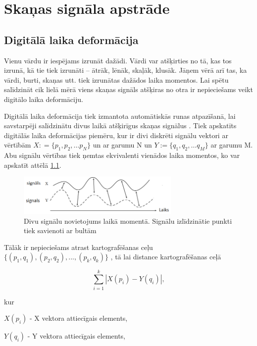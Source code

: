 \documentclass[12pt,paper=A4]{report}
\begin{document}
\chapter{Skaņas signāla apstrāde}



\section{Digitālā laika deformācija}

Vienu vārdu ir iespējams izrunāt dažādi. Vārdi var atšķirties no tā, kas tos izrunā, kā tie tiek izrunāti – ātrāk, lēnāk, skaļāk, klusāk. Jāņem vērā arī tas, ka vārdi, burti, skaņas utt. tiek izrunātas dažādos laika momentos. Lai spētu salīdzināt cik lielā mērā viens skaņas signāls atšķiras no otra ir nepieciešams veikt digitālo laika deformāciju. 

Digitālā laika deformācija tiek izmantota automātiskās runas atpazīšanā, lai savstarpēji salīdzinātu divus laikā atšķirīgus skaņas signālus \cite{DynamicTimeWrapping}.
Tiek apskatīts digitālās laika deformācijas piemēru, kur ir divi diskrēti signālu vektori ar vērtībām $X: = \{p_1,p_2,…p_N\}$ un ar garumu N un $Y:= \{q_1,q_2,…q_M\}$ ar garumu M. Abu signālu vērtības tiek ņemtas ekvivalenti vienādos laika momentos, ko var apskatīt attēlā \ref{different-time-intervals}. 

\begin{figure}[H] \centering
\includegraphics[width=0.70\textwidth]{dtw} 
\caption{Divu signālu novietojums laikā momentā. Signālu izlīdzinātie punkti tiek savienoti ar bultām \cite{DynamicTimeWrapping}}  \label{different-time-intervals} 
\end{figure}

Tālāk ir nepieciešams atrast kartografēšanas ceļu $\{(p_1,q_1),(p_2,q_2),...,(p_k,q_k)\}$ , tā lai distance kartografēšanas ceļā 

\begin{equation}
\sum\limits^k_{i=1} |X(p_i)−Y(q_i)|,
\end{equation}

kur 

$X(p_i)$ - X vektora attiecīgais elements,

$Y(q_i)$ - Y vektora attiecīgais elements,
\end{document}
